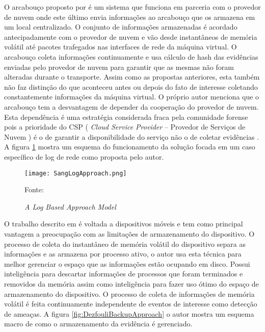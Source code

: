O arcabouço proposto por \cite{SangLogApproach:2013} é um sistema que funciona em parceria com o provedor de nuvem onde este último envia informações ao arcabouço que os armazena em um local centralizado.
%
O conjunto de informações armazenadas é acordado antecipadamente com o provedor de nuvem e vão desde instantâneos de memória volátil até pacotes trafegados nas interfaces de rede da máquina virtual.
%
O arcabouço coleta informações continuamente e usa cálculo de hash das evidências enviadas pelo provedor de nuvem para garantir que as mesmas não foram alteradas durante o transporte.
%
Assim como as propostas anteriores, esta também não faz distinção do que aconteceu antes ou depois do fato de interesse coletando constantemente informações da máquina virtual.
%
O próprio autor menciona que o arcabouço tem a desvantagem de depender da cooperação do provedor de nuvem. Esta dependência é uma estratégia considerada fraca pela comunidade forense pois a prioridade do CSP ( \textit{Cloud Service Provider} -- Provedor de Serviços de Nuvem ) é o de garantir a disponibilidade do serviço não o de coletar evidências \cite{ClarkeReviewOfChallenges2015}.
%
A figura \ref{fig:SangLogApproach} mostra um esquema do funcionamento da solução focada em um caso específico de log de rede como proposta pelo autor.

\begin{figure}[htb!]
\footnotesize
\caption{\textit{A Log Based Approach Model}}
\texttt{[image: SangLogApproach.png]}
\centering
\label{fig:SangLogApproach}
\begin{center}
Fonte: \cite{SangLogApproach:2013} 
\end{center}
\end{figure}

O trabalho descrito em \cite{DezfouliBackupApproach:2012} é voltada a dispositivos móveis e tem como principal vantagem a preocupação com as limitações de armazenamento do dispositivo.
%
O processo de coleta do instantâneo de memória volátil do dispositivo separa as informações e as armazena por processo ativo, o autor usa esta técnica para melhor gerenciar o espaço que as informações estão ocupando em disco. 
%
Possui inteligência para descartar informações de processos que foram terminados e removidos da memória assim como inteligência para fazer uso ótimo do espaço de armazenamento do dispositivo.
%
O processo de coleta de informações de memória volátil é feita continuamente independente de eventos de interesse como detecção de ameaças.
%
A figura \ref{fig:DezfouliBackupApproach} o autor mostra um esquema macro de como o armazenamento da evidência é gerenciado.

